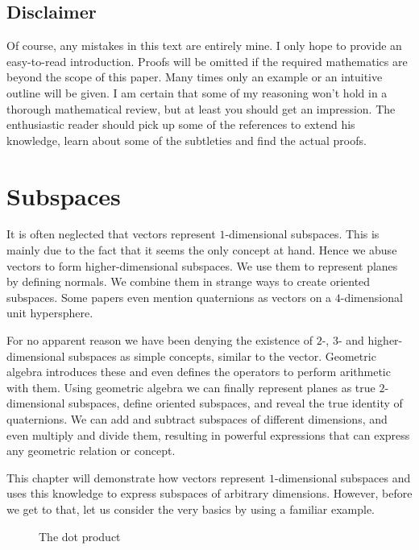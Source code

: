 \documentclass[10pt]{report}
\begin{document}
\section{Disclaimer}

Of course, any mistakes in this text are entirely mine. I only
hope to provide an easy-to-read introduction. Proofs will be
omitted if the required mathematics are beyond the scope of this
paper. Many times only an example or an intuitive outline will be
given. I am certain that some of my reasoning won't hold in a
thorough mathematical review, but at least you should get an
impression. The enthusiastic reader should pick up some of the
references to extend his knowledge, learn about some of the
subtleties and find the actual proofs.

\chapter{Subspaces}

It is often neglected that vectors represent $1$-dimensional
subspaces. This is mainly due to the fact that it seems the only
concept at hand. Hence we abuse vectors to form higher-dimensional
subspaces. We use them to represent planes by defining normals. We
combine them in strange ways to create oriented subspaces. Some
papers even mention quaternions as vectors on a $4$-dimensional
unit hypersphere.

For no apparent reason we have been denying the existence of $2$-,
$3$- and higher-dimensional subspaces as simple concepts, similar
to the vector. Geometric algebra introduces these and even defines
the operators to perform arithmetic with them. Using geometric
algebra we can finally represent planes as true $2$-dimensional
subspaces, define oriented subspaces, and reveal the true identity
of quaternions. We can add and subtract subspaces of different
dimensions, and even multiply and divide them, resulting in
powerful expressions that can express any geometric relation or
concept.

This chapter will demonstrate how vectors represent
$1$-dimensional subspaces and uses this knowledge to express
subspaces of arbitrary dimensions. However, before we get to that,
let us consider the very basics by using a familiar example.

\begin{figure}[ht]
\centering

\caption{The dot product} \label{fig:dot product}
\end{figure}
\end{document}
